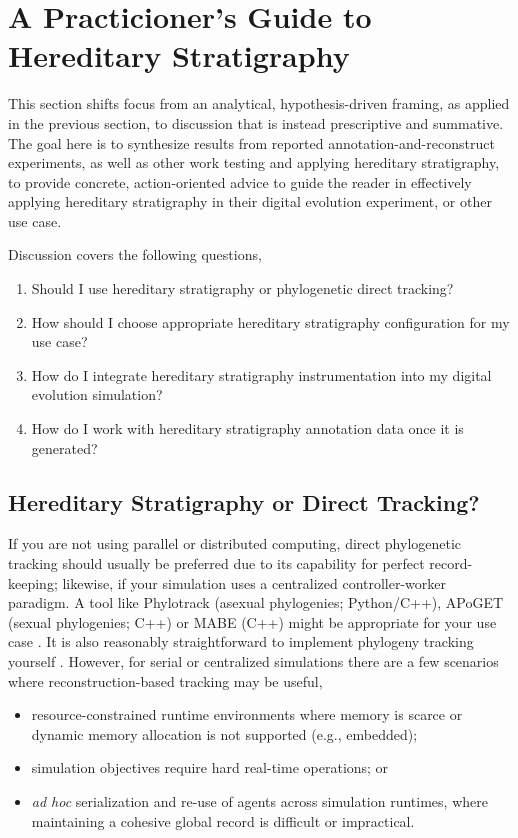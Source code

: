 \section{A Practicioner's Guide to Hereditary Stratigraphy} \label{sec:synthesis}

This section shifts focus from an analytical, hypothesis-driven framing, as applied in the previous section, to discussion that is instead prescriptive and summative.
The goal here is to synthesize results from reported annotation-and-reconstruct experiments, as well as other work testing and applying hereditary stratigraphy, to provide concrete, action-oriented advice to guide the reader in effectively applying hereditary stratigraphy in their digital evolution experiment, or other use case.

Discussion covers the following questions,
\begin{enumerate}
\item Should I use hereditary stratigraphy or phylogenetic direct tracking?
\item How should I choose appropriate hereditary stratigraphy configuration for my use case?
\item How do I integrate hereditary stratigraphy instrumentation into my digital evolution simulation?
\item How do I work with hereditary stratigraphy annotation data once it is generated?
\end{enumerate}

\subsection{Hereditary Stratigraphy or Direct Tracking?}

If you are not using parallel or distributed computing, direct phylogenetic tracking should usually be preferred due to its capability for perfect record-keeping; likewise, if your simulation uses a centralized controller-worker paradigm.
A tool like Phylotrack (asexual phylogenies; Python/C++), APoGET (sexual phylogenies; C++) or MABE (C++) might be appropriate for your use case \citep{dolson2024phylotrack,bohm2017modular}.
It is also reasonably straightforward to implement phylogeny tracking yourself \citep{moreno2024algorithms}.
However, for serial or centralized simulations there are a few scenarios where reconstruction-based tracking may be useful,
\begin{itemize}
\item resource-constrained runtime environments where memory is scarce or dynamic memory allocation is not supported (e.g., embedded);
\item simulation objectives require hard real-time operations; or
\item \textit{ad hoc} serialization and re-use of agents across simulation runtimes, where maintaining a cohesive global record is difficult or impractical.
\end{itemize}

